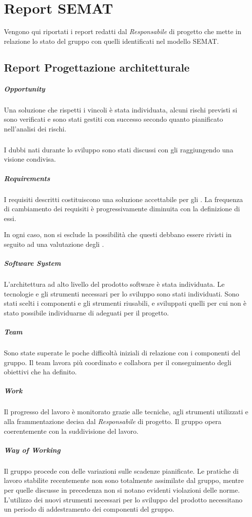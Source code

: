 \section{Report SEMAT}
Vengono qui riportati i report redatti dal \textit{Responsabile} di progetto che mette in relazione lo stato del gruppo con quelli identificati nel modello SEMAT.

\subsection{Report Progettazione architetturale}

	\subparagraph{Opportunity}
	Una soluzione che rispetti i vincoli è stata individuata, alcuni rischi previsti si sono verificati e sono stati gestiti con successo secondo quanto pianificato nell'analisi dei rischi.

	\subparagraph{}
	I dubbi nati durante lo sviluppo sono stati discussi con gli  raggiungendo una visione condivisa.

	\subparagraph{Requirements}
	I requisiti descritti costituiscono una soluzione accettabile per gli . La frequenza di cambiamento dei requisiti è progressivamente diminuita con la definizione di essi.

	In ogni caso, non si esclude la possibilità che questi debbano essere rivisti in seguito ad una valutazione degli .

	\subparagraph{Software System}
	L'architettura ad alto livello del prodotto software è stata individuata. Le tecnologie e gli strumenti necessari per lo sviluppo sono stati individuati. Sono stati scelti i componenti e gli strumenti riusabili, e sviluppati quelli per cui non è stato possibile individuarne di adeguati per il progetto.

	\subparagraph{Team}
	Sono state superate le poche difficoltà iniziali di relazione con i componenti del gruppo. Il team lavora più coordinato e collabora per il conseguimento degli obiettivi che ha definito.

	\subparagraph{Work}
	Il progresso del lavoro è monitorato grazie alle tecniche, agli strumenti utilizzati e alla frammentazione decisa dal \textit{Responsabile} di progetto. Il gruppo opera coerentemente con la suddivisione del lavoro.

	\subparagraph{Way of Working}
	Il gruppo procede con delle variazioni sulle scadenze pianificate. Le pratiche di lavoro stabilite recentemente non sono totalmente assimilate dal gruppo, mentre per quelle discusse in precedenza non si notano evidenti violazioni delle norme. L'utilizzo dei nuovi strumenti necessari per lo sviluppo del prodotto necessitano un periodo di addestramento dei componenti del gruppo.
	
